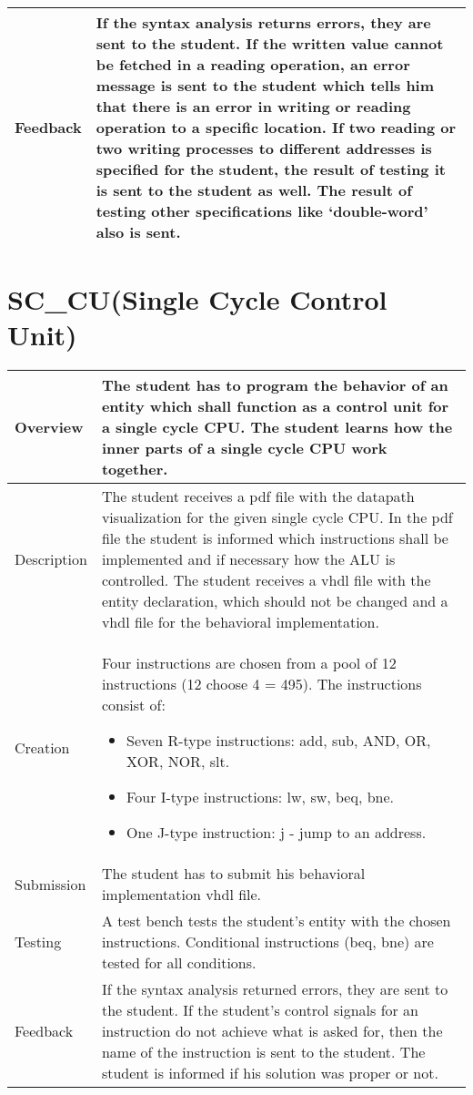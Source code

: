     \begin{tabular}{|p{2cm}|p{11cm}|}
        \hline
        Feedback & If the syntax analysis returns errors, they are sent to the student. If the written value cannot be fetched in a reading operation,
        an error message is sent to the student which tells him that there is an error in writing or reading operation to a specific location. If two
        reading or two writing processes to different addresses is specified for the student, the result of testing it is sent to the student as well.
        The result of testing other specifications like ‘double-word’ also is sent.
        \\
        \hline
    \end{tabular}

\newpage

\section{SC\_CU(Single Cycle Control Unit)} \label{SC_CU}
    \begin{tabular}{|p{2cm}|p{11cm}|}
        \hline
        Overview & The student has to program the behavior of an entity which shall function as a control unit for a single cycle CPU. The student learns how the inner parts of a single cycle CPU work together.
        \\
        \hline
        Description & The student receives a pdf file with the datapath visualization for the given single cycle CPU. In the pdf file the student is informed which instructions shall be implemented and if necessary how the ALU is controlled. The student receives a vhdl file with the entity declaration, which should not be changed and a vhdl file for the behavioral implementation.
        \\
        \hline
        Creation & Four instructions are chosen from a pool of 12 instructions (12 choose 4 = 495). The instructions consist of:
        \begin{itemize}
            \item Seven R-type instructions: add, sub, AND, OR, XOR, NOR, slt.
            \item Four I-type instructions: lw, sw, beq, bne.
            \item One J-type instruction: j - jump to an address.
        \end{itemize}
        \\
        \hline
        Submission & The student has to submit his behavioral implementation vhdl file.
        \\
        \hline
        Testing & A test bench tests the student's entity with the chosen instructions. Conditional instructions (beq, bne) are tested for all conditions.
        \\
        \hline
        Feedback & If the syntax analysis returned errors, they are sent to the student. If the student's control signals for an instruction do not achieve what is asked for, then the name of the instruction is sent to the student. The student is informed if his solution was proper or not.
        \\
        \hline
    \end{tabular}

